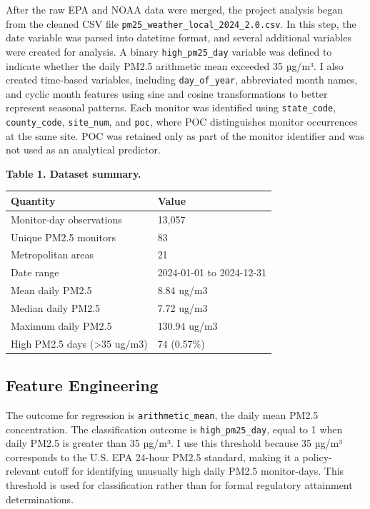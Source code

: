 \documentclass[
  letterpaper,
  DIV=11,
  numbers=noendperiod]{scrartcl}
\begin{document}
After the raw EPA and NOAA data were merged, the project analysis began
from the cleaned CSV file \texttt{pm25\_weather\_local\_2024\_2.0.csv}.
In this step, the date variable was parsed into datetime format, and
several additional variables were created for analysis. A binary
\texttt{high\_pm25\_day} variable was defined to indicate whether the
daily PM2.5 arithmetic mean exceeded 35 µg/m³. I also created time-based
variables, including \texttt{day\_of\_year}, abbreviated month names,
and cyclic month features using sine and cosine transformations to
better represent seasonal patterns. Each monitor was identified using
\texttt{state\_code}, \texttt{county\_code}, \texttt{site\_num}, and
\texttt{poc}, where POC distinguishes monitor occurrences at the same
site. POC was retained only as part of the monitor identifier and was
not used as an analytical predictor.

\textbf{Table 1. Dataset summary.}

\begin{longtable}[]{@{}ll@{}}
\toprule\noalign{}
Quantity & Value \\
\midrule\noalign{}
\endhead
\bottomrule\noalign{}
\endlastfoot
Monitor-day observations & 13,057 \\
Unique PM2.5 monitors & 83 \\
Metropolitan areas & 21 \\
Date range & 2024-01-01 to 2024-12-31 \\
Mean daily PM2.5 & 8.84 ug/m3 \\
Median daily PM2.5 & 7.72 ug/m3 \\
Maximum daily PM2.5 & 130.94 ug/m3 \\
High PM2.5 days (\textgreater35 ug/m3) & 74 (0.57\%) \\
\end{longtable}

\subsection{Feature Engineering}\label{feature-engineering}

The outcome for regression is \texttt{arithmetic\_mean}, the daily mean
PM2.5 concentration. The classification outcome is
\texttt{high\_pm25\_day}, equal to 1 when daily PM2.5 is greater than 35
µg/m³. I use this threshold because 35 µg/m³ corresponds to the U.S. EPA
24-hour PM2.5 standard, making it a policy-relevant cutoff for
identifying unusually high daily PM2.5 monitor-days. This threshold is
used for classification rather than for formal regulatory attainment
determinations.
\end{document}
